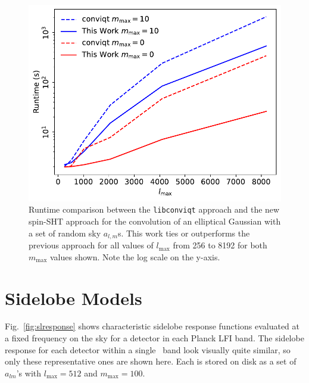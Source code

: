 \documentclass[twocolumn]{aa}
\begin{document}
\begin{figure}[t]
  \center
  \includegraphics[width=\linewidth]{scripts/runtime.pdf}
	\caption{Runtime comparison between the \texttt{libconviqt} approach and the new spin-SHT approach for the convolution of an elliptical Gaussian with a set of random sky $a_{l,m}$s. This work ties or outperforms the previous approach for all values of $l_\mathrm{max}$ from 256 to 8192 for both $m_\mathrm{max}$ values shown. Note the log scale on the y-axis.
  }\label{fig:speed}
\end{figure}

\section{Sidelobe Models}

Fig.~\ref{fig:slresponse} shows characteristic sidelobe response functions evaluated at a fixed frequency on the sky for a detector in each Planck LFI band. The sidelobe response for each detector within a single \Planck\ band look visually quite similar, so only these representative ones are shown here. Each is stored on disk as a set of $a_{lm}$'s with $l_\mathrm{max} = 512$ and $m_\mathrm{max} = 100$. 
\end{document}

